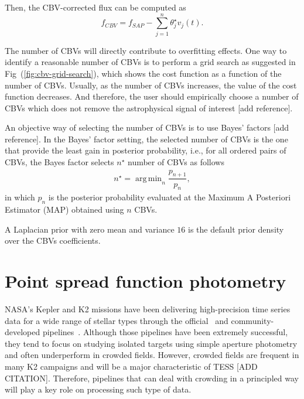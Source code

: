 \documentclass[twocolumn]{aastex62}
\DeclareMathOperator*{\argmin}{arg\,min}
\begin{document}
Then, the CBV-corrected flux can be computed as
\begin{equation}
    f_{CBV} = f_{SAP} - \sum_{j=1}^{n}\theta^{\star}_j v_{j}(t).
\end{equation}


The number of CBVs will directly contribute to overfitting effects. One
way to identify a reasonable number of CBVs is to perform a grid search
as suggested in Fig~(\ref{fig:cbv-grid-search}), which shows the cost
function as a function of the number of CBVs. Usually, as the number of
CBVs increases, the value of the cost function decreases. And therefore,
the user should empirically choose a number of CBVs which does not
remove the astrophysical signal of interest [add reference].



An objective way of selecting the number of CBVs is to use Bayes' factors
[add reference]. In the Bayes' factor setting, the selected number of
CBVs is the one that provide the least gain in posterior probability, i.e.,
for all ordered pairs of CBVs, the Bayes factor selects $n^{\star}$ number of CBVs
as follows
\begin{align}
    n^{\star} = \argmin_{n} \dfrac{p_{n+1}}{p_n},
\end{align}
in which $p_n$ is the posterior probability evaluated at the Maximum A Posteriori
Estimator (MAP) obtained using $n$ CBVs.

A Laplacian prior with zero mean and variance $16$ is the default prior
density over the CBVs coefficients.

\section{Point spread function photometry}
\label{appendix:psf}

NASA's Kepler and K2 missions have been delivering high-precision time series data
for a wide range of stellar types through the official~\cite{jenkins2010} and community-developed
pipelines~\cite{vanderburg2014, luger2016, aigrain2016}. Although those pipelines have
been extremely successful, they tend to focus on studying isolated targets using simple
aperture photometry and often underperform in crowded fields.
However, crowded fields are frequent in many K2 campaigns and will
be a major characteristic of TESS [ADD CITATION]. Therefore, pipelines that can deal with
crowding in a principled way will play a key role on processing such type of data.
\end{document}
